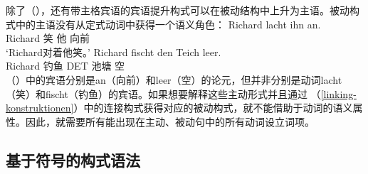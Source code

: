 除了（），还有带主格宾语的宾语提升构式可以在被动结构中上升为主语。被动构式中的主语没有从定式动词中获得一个语义角色：
\eal
\ex
\gll Richard lacht ihn an.\\
     Richard 笑 他 向前\\
\glt `Richard对着他笑。'
\ex
\gll Richard fischt den Teich leer.\\
     Richard 钓鱼 DET 池塘 空\\
\zl
 （）中的宾语分别是an（向前）和leer（空）的论元，但并非分别是动词lacht（笑）和fischt（钓鱼）的宾语。如果想要解释这些主动形式并且通过 （\ref{linking-konstruktionen}）中的连接构式获得对应的被动构式，就不能借助于动词的语义属性。因此，就需要所有能出现在主动、被动句中的所有动词设立词项。

\subsection{基于符号的构式语法}
\label{sec-SbCxG}\label{sec-sbcg}\label{sec-SBCG}

